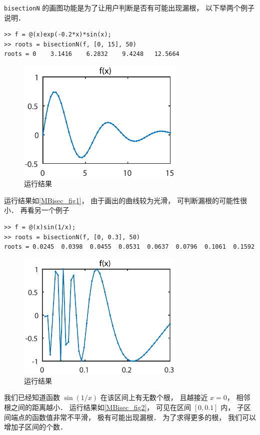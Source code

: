 \lstinline|bisectionN| 的画图功能是为了让用户判断是否有可能出现漏根， 以下举两个例子说明．
\begin{lstlisting}[language=matlabC]
>> f = @(x)exp(-0.2*x)*sin(x);
>> roots = bisectionN(f, [0, 15], 50)
roots = 0    3.1416    6.2832    9.4248   12.5664
\end{lstlisting}
\begin{figure}[ht]
\centering
\includegraphics[width=8cm]{./figures/MBisec_1.pdf}
\caption{运行结果} \label{MBisec_fig1}
\end{figure}
运行结果如\autoref{MBisec_fig1}， 由于画出的曲线较为光滑， 可判断漏根的可能性很小． 再看另一个例子
\begin{lstlisting}[language=matlabC]
>> f = @(x)sin(1/x);
>> roots = bisectionN(f, [0, 0.3], 50)
roots = 0.0245  0.0398  0.0455  0.0531  0.0637  0.0796  0.1061  0.1592
\end{lstlisting}
\begin{figure}[ht]
\centering
\includegraphics[width=8cm]{./figures/MBisec_2.pdf}
\caption{运行结果} \label{MBisec_fig2}
\end{figure}
我们已经知道函数 $\sin(1/x)$ 在该区间上有无数个根， 且越接近 $x = 0$， 相邻根之间的距离越小． 运行结果如\autoref{MBisec_fig2}，  可见在区间 $[0, 0.1]$ 内， 子区间端点的函数值非常不平滑， 极有可能出现漏根． 为了求得更多的根， 我们可以增加子区间的个数．
